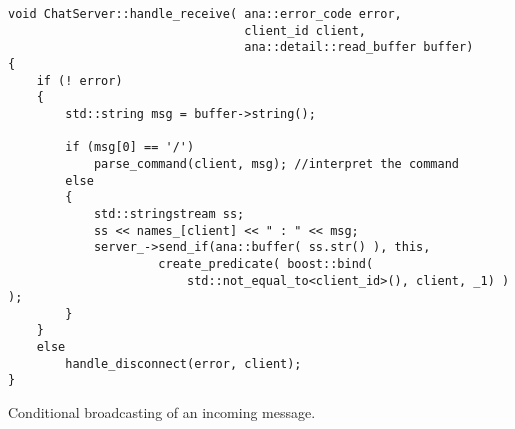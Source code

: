 \documentclass[a4paper,12pt,english]{article}
\begin{document}
\begin{table}[!htb]
\lstset{language=C++}
\begin{lstlisting}[frame=single]
void ChatServer::handle_receive( ana::error_code error, 
                                 client_id client, 
                                 ana::detail::read_buffer buffer)
{
    if (! error)
    {
        std::string msg = buffer->string();

        if (msg[0] == '/')
            parse_command(client, msg); //interpret the command
        else
        {
            std::stringstream ss;
            ss << names_[client] << " : " << msg;
            server_->send_if(ana::buffer( ss.str() ), this,
                     create_predicate( boost::bind( 
                         std::not_equal_to<client_id>(), client, _1) ) );
        }
    }
    else
        handle_disconnect(error, client);
}
\end{lstlisting}
\centering \caption{Conditional broadcasting of an incoming message.} 
\label{server-message}
\end{table} 
\end{document}
